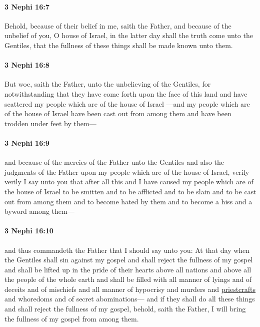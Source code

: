 		\paragraph{3 Nephi 16:7} %
			\label{3NEPHI-16-7}

			Behold, because of their belief in me, saith the Father,
			and because of the unbelief of you, O house of Israel,
			in the latter day shall the truth come unto the Gentiles,
			that the fullness of these things shall be made known unto them.

		\paragraph{3 Nephi 16:8} %
			\label{3NEPHI-16-8}

			But woe, saith the Father, unto the unbelieving of the Gentiles,
			for notwithstanding that they have come forth upon the face of this land
			and have scattered my people which are of the house of Israel
			---and my people which are of the house of Israel
			have been cast out from among them
			and have been trodden under feet by them---

		\paragraph{3 Nephi 16:9} %
			\label{3NEPHI-16-9}

			and because of the mercies of the Father unto the Gentiles
			and also the judgments of the Father
			upon my people which are of the house of Israel,
			verily verily I say unto you
			that after all this and I have caused my people which are of the house of Israel
			to be smitten and to be afflicted and to be slain
			and to be cast out from among them and to become hated by them
			and to become a hiss and a byword among them---

		\paragraph{3 Nephi 16:10} %
			\label{3NEPHI-16-10}

			and thus commandeth the Father that I should say unto you:
			At that day when the Gentiles shall sin against my gospel
			and shall reject the fullness of my gospel
			and shall be lifted up in the pride of their hearts
			above all nations and above all the people of the whole earth
			and shall be filled with all manner of lyings and of deceits and of mischiefs
			and all manner of hypocrisy
			and murders and \hyperref[PRIESTCRAFT]{priestcrafts} and whoredoms
			and of secret abominations---
			and if they shall do all these things and shall reject the fullness of my gospel,
			behold, saith the Father, I will bring the fullness of my gospel from among them.

